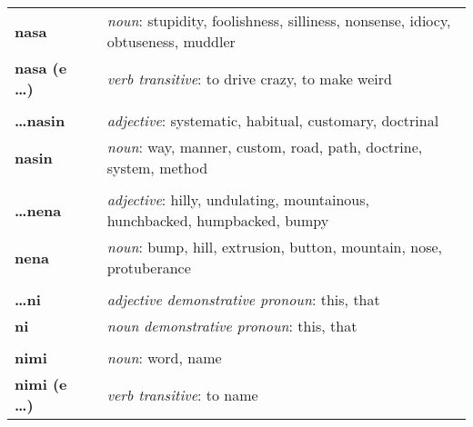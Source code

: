 \begin{supertabular}{p{2,5cm}|ll}
    \textbf{nasa}                &  & \textit{noun}: stupidity, foolishness, silliness, nonsense, idiocy, obtuseness, muddler                    \\
    \textbf{nasa (e \dots)}      &  & \textit{verb transitive}: to drive crazy, to make weird                                                    \\
                                 &  &                                                                                                            \\ %
    \textbf{\dots nasin}         &  & \textit{adjective}: systematic, habitual, customary, doctrinal                                             \\
    \textbf{nasin}               &  & \textit{noun}: way, manner, custom, road, path, doctrine, system, method                                   \\
                                 &  &                                                                                                            \\ %
    \textbf{\dots nena}          &  & \textit{adjective}: hilly, undulating, mountainous, hunchbacked, humpbacked, bumpy                         \\
    \textbf{nena}                &  & \textit{noun}: bump, hill, extrusion, button, mountain, nose, protuberance                                 \\
                                 &  &                                                                                                            \\ %
    \textbf{\dots ni}            &  & \textit{adjective demonstrative pronoun}: this, that                                                       \\
    \textbf{ni}                  &  & \textit{noun demonstrative pronoun}: this, that                                                            \\
                                 &  &                                                                                                            \\ %
    \textbf{nimi}                &  & \textit{noun}: word, name                                                                                  \\
    \textbf{nimi (e \dots )}     &  & \textit{verb transitive}: to name                                                                          \\

\end{supertabular}
